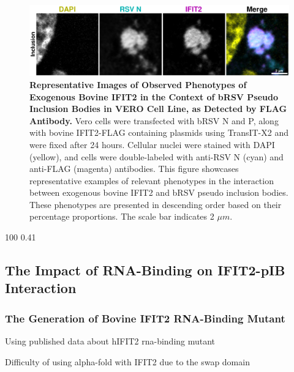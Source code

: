 \begin{figure}
    \centering
    \includegraphics[width=1\linewidth]{08. Chapter 3/Figs/03. pIB/03. IFIT2/04. IFIT2-FLAG/03. FLAG/09. bi2f-bnbp.pdf}
    \caption[Representative Images of Observed Phenotypes of Exogenous Bovine IFIT2 in the Context of bRSV Pseudo Inclusion Bodies in VERO Cell Line, as Detected by FLAG Antibody.]{\textbf{Representative Images of Observed Phenotypes of Exogenous Bovine IFIT2 in the Context of bRSV Pseudo Inclusion Bodies in VERO Cell Line, as Detected by FLAG Antibody.} Vero cells were transfected with bRSV N and P, along with bovine IFIT2-FLAG containing plasmids using TransIT-X2 and were fixed after 24 hours. Cellular nuclei were stained with DAPI (yellow), and cells were double-labeled with anti-RSV N (cyan) and anti-FLAG (magenta) antibodies. This figure showcases representative examples of relevant phenotypes in the interaction between exogenous bovine IFIT2 and bRSV pseudo inclusion bodies. These phenotypes are presented in descending order based on their percentage proportions. The scale bar indicates 2 \(\mu m\).}
    \label{fig:Representative Images of Observed Phenotypes of Exogenous Bovine IFIT2 in the Context of bRSV Pseudo Inclusion Bodies in VERO Cell Line, as Detected by FLAG Antibody}
\end{figure}

100
0.41

\subsection{The Impact of RNA-Binding on IFIT2-pIB Interaction} \label{subsec:The Impact of RNA-Binding on IFIT2-pIB Interaction}
\subsubsection{The Generation of Bovine IFIT2 RNA-Binding Mutant} \label{The Generation of Bovine IFIT2 RNA-Binding Mutant}
Using published data about hIFIT2 rna-binding mutant

Difficulty of using alpha-fold with IFIT2 due to the swap domain

